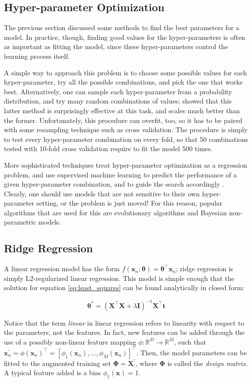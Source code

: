 \documentclass[a4paper]{book}
\begin{document}
\subsection{Hyper-parameter Optimization}
The previous section discussed some methods to find the best parameters for a model. In practice, though, finding good values for the hyper-parameters is often as important as fitting the model, since these hyper-parameters control the learning process itself.

A simple way to approach this problem is to choose some possible values for each hyper-parameter, try all the possible combinations, and pick the one that works best. Alternatively, one can sample each hyper-parameter from a probability distribution, and try many random combinations of values; \cite{random_search} showed that this latter method is surprisingly effective at this task, and scales much better than the former. Unfortunately, this procedure can overfit, too, so it has to be paired with some resampling technique such as cross validation. The procedure is simply to test every hyper-parameter combination on every fold, so that 50 combinations tested with 10-fold cross validation require to fit the model 500 times.

More sophisticated techniques treat hyper-parameter optimization as a regression problem, and use supervised machine learning to predict the performance of a given hyper-parameter combination, and to guide the search accordingly \citep{hyperopt}. Clearly, one should use models that are not sensitive to their own hyper-parameter setting, or the problem is just moved! For this reason, popular algorithms that are used for this are evolutionary algorithms and Bayesian non-parametric models.

\subsection{Ridge Regression}
\label{sec:ridge}
A linear regression model has the form $f(\bm x_n;\bm\theta)=\bm\theta^\intercal\bm x_n$; ridge regression is simply L2-regularized linear regression. This model is simple enough that the solution for equation \ref{eq:least_squares} can be found analytically in closed form:

\begin{equation}
\label{eq:ridge_solution}
\bm\theta^*=(\bm X^\intercal\bm X+\lambda\bm I)^{-1}\bm X^\intercal\bm t
\end{equation}

Notice that the term \emph{linear} in linear regression refers to linearity with respect to the parameters, not the features. In fact, new features can be added through the use of a possibly non-linear feature mapping $\phi:\mathbb{R}^D\rightarrow\mathbb{R}^M$, such that $\bm x^\prime_n=\phi(\bm x_n)^\intercal=\left[\phi_1(\bm x_n),\ldots,\phi_M(\bm x_n)\right]^\intercal$. Then, the model parameters can be fitted to the augmented training set $\bm\Phi=\bm X^\prime$, where $\bm\Phi$ is called the \emph{design matrix}. A typical feature added is a bias $\phi_1(\bm x)=1$.
\end{document}
